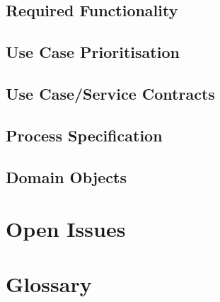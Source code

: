 \documentclass[a4paper]{article}
\begin{document}
\subsection{Required Functionality}

\subsection{Use Case Prioritisation}

\subsection{Use Case/Service Contracts}

\subsection{Process Specification}

\subsection{Domain Objects}

\section{Open Issues}

\section{Glossary}
\end{document}
